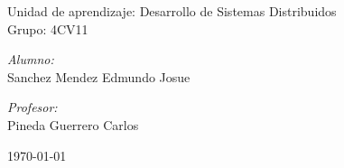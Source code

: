 \documentclass[11pt]{article}
\begin{document}
\begin{titlepage}
\begin{center}
				{ \Large Unidad de aprendizaje: Desarrollo de Sistemas Distribuidos} \\[1cm]
				
				{ \Large Grupo: 4CV11 } \\[1cm]
				
				\noindent
				\begin{minipage}{0.5\textwidth}
					\begin{flushleft} \large
						\emph{Alumno:} \\
						Sanchez Mendez Edmundo Josue
					\end{flushleft}
				\end{minipage}%
				\begin{minipage}{0.5\textwidth}
					\begin{flushright} \large
						\emph{Profesor:} \\
						Pineda Guerrero Carlos 
					\end{flushright}
				\end{minipage}
				
				\vfill
				{\large {\today}}
			\end{center}
		\end{titlepage}
	
	\titlepage
	\tableofcontents
	\newpage
	
\end{document}
